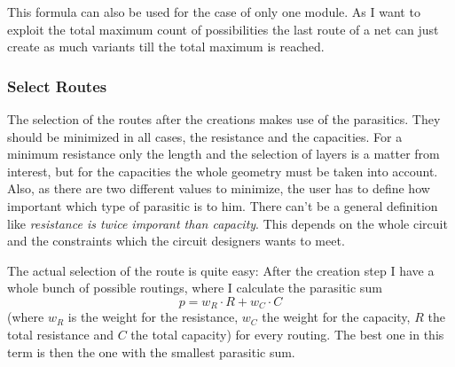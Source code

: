 This formula can also be used for the case of only one module. As I want to exploit the total maximum count of possibilities the last route of a net can just create as much variants till the total maximum is reached.

\subsubsection{Select Routes}
The selection of the routes after the creations makes use of the parasitics. They should be minimized in all cases, the resistance and the capacities. For a minimum resistance only the length and the selection of layers is a matter from interest, but for the capacities the whole geometry must be taken into account. Also, as there are two different values to minimize, the user has to define how important which type of parasitic is to him. There can't be a general definition like \emph{resistance is twice imporant than capacity}. This depends on the whole circuit and the constraints which the circuit designers wants to meet.

The actual selection of the route is quite easy: After the creation step I have a whole bunch of possible routings, where I calculate the parasitic sum
\[p = w_R \cdot R + w_C \cdot C\]
(where $w_R$ is the weight for the resistance, $w_C$ the weight for the capacity, $R$ the total resistance and $C$ the total capacity) for every routing. The best one in this term is then the one with the smallest parasitic sum.